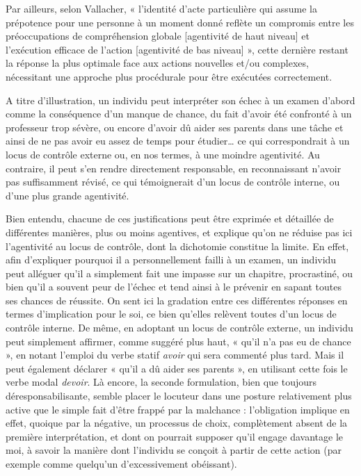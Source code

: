 Par ailleurs, selon Vallacher, « l'identité d'acte particulière qui assume la prépotence pour une personne à un moment donné reflète un compromis entre les préoccupations de compréhension globale [agentivité de haut niveau] et l'exécution efficace de l'action [agentivité de bas niveau] », cette dernière restant la réponse la plus optimale face aux actions nouvelles et/ou complexes, nécessitant une approche plus procédurale pour être exécutées correctement.

A titre d’illustration, un individu peut interpréter son échec à un examen d’abord comme la conséquence d’un manque de chance, du fait d'avoir été confronté à un professeur trop sévère, ou encore d'avoir dû aider ses parents dans une tâche et ainsi de ne pas avoir eu assez de temps pour étudier… ce qui correspondrait à un locus de contrôle externe ou, en nos termes, à une moindre agentivité. Au contraire, il peut s’en rendre directement responsable, en reconnaissant n’avoir pas suffisamment révisé, ce qui témoignerait d’un locus de contrôle interne, ou d’une plus grande agentivité.

Bien entendu, chacune de ces justifications peut être exprimée et détaillée de différentes manières, plus ou moins agentives, et explique qu’on ne réduise pas ici l’agentivité au locus de contrôle, dont la dichotomie constitue la limite. En effet, afin d’expliquer pourquoi il a personnellement failli à un examen, un individu peut alléguer qu’il a simplement fait une impasse sur un chapitre, procrastiné, ou bien qu’il a souvent peur de l’échec et tend ainsi à le prévenir en sapant toutes ses chances de réussite. On sent ici la gradation entre ces différentes réponses en termes d’implication pour le soi, ce bien qu'elles relèvent toutes d’un locus de contrôle interne. De même, en adoptant un locus de contrôle externe, un individu peut simplement affirmer, comme suggéré plus haut, « qu’il n’a pas eu de chance », en notant l’emploi du verbe statif \textit{avoir} qui sera commenté plus tard. Mais il peut également déclarer « qu’il a dû aider ses parents », en utilisant cette fois le verbe modal \textit{devoir}. Là encore, la seconde formulation, bien que toujours déresponsabilisante, semble placer le locuteur dans une posture relativement plus active que le simple fait d'être frappé par la malchance : l’obligation implique en effet, quoique par la négative, un processus de choix, complètement absent de la première interprétation, et dont on pourrait supposer qu’il engage davantage le moi, à savoir la manière dont l’individu se conçoit à partir de cette action (par exemple comme quelqu'un d'excessivement obéissant).

